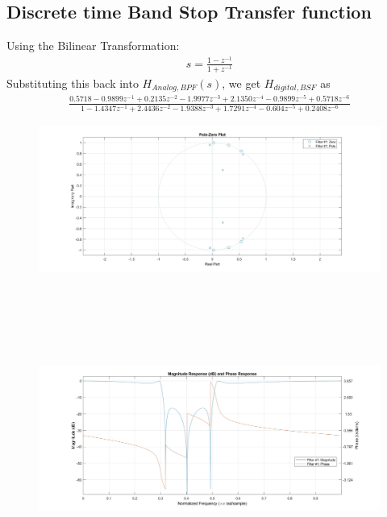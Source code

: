 \documentclass[12pt]{article}
\begin{document}
\color{cyan}
\subsection{Discrete time Band Stop Transfer function}
\color{black}
Using the Bilinear Transformation:
\begin{gather*}
	s = \frac{1-z^{-1}}{1+z^{-1}}
\end{gather*}
Substituting this back into $H_{Analog,BPF}(s)$, we get $H_{digital,BSF}$ as
\begin{gather*}
	\frac{0.5718 - 0.9899z^{-1} + 0.2135z^{-2} - 1.9977z^{-3} + 2.1350z^{-4} - 0.9899z^{-5} + 0.5718z^{-6}}{1 - 1.4347z^{-1} + 2.4436z^{-2} - 1.9388z^{-3} + 1.7291z^{-4} - 0.604z^{-5} + 0.2408z^{-6}}
\end{gather*}
\begin{figure}[H]
	\centering
	\includegraphics[width = 18cm]{Filter4PZ.jpg}
\end{figure}
\begin{figure}[H]
	\centering
	\includegraphics[width = 18cm, height = 10cm]{Filter4MagPhase.jpg}
\end{figure}
\end{document}
